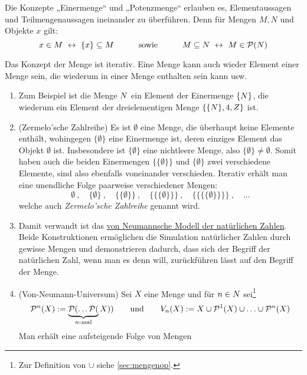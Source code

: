 \begin{bem}
    Die Konzepte „Einermenge“ und „Potenzmenge“ erlauben es, Elementaussagen und Teilmengenaussagen ineinander zu überführen. Denn für Mengen $M,N$ und Objekte $x$ gilt:
        \[ x\in M\ \leftrightarrow\ \{x\}\subseteq M \quad\qquad\text{sowie}\quad\qquad M\subseteq N\  \leftrightarrow\ M\in \calP(N) \]
\end{bem}


\begin{vorschau} \label{mengeniterativ}
    Das Konzept der Menge ist iterativ. Eine Menge kann auch wieder Element einer Menge sein, die wiederum in einer Menge enthalten sein kann usw.
    \begin{enumerate}[(1)]
        \item Zum Beispiel ist die Menge $\relax N$ ein Element der Einermenge $\{\relax N\}$, die wiederum ein Element der dreielementigen Menge $\{ \{\relax N \}, 4, \relax Z\}$ ist.
        \item(Zermelo'sche Zahlreihe) Es ist $\emptyset$ eine Menge, die überhaupt keine Elemente enthält, wohingegen $\{\emptyset\}$ eine Einermenge ist, deren einziges Element das Objekt $\emptyset$ ist. Insbesondere ist $\{\emptyset\}$ eine nichtleere Menge, also $\{\emptyset\}\neq \emptyset$. Somit haben auch die beiden Einermengen $\{\{\emptyset\}\}$ und $\{\emptyset\}$ zwei verschiedene Elemente, sind also ebenfalls voneinander verschieden. Iterativ erhält man eine unendliche Folge paarweise verschiedener Mengen:
        \[ \emptyset \ ,\quad \{\emptyset\} \ ,\quad \{\{\emptyset\}\} \ ,\quad \{\{\{\emptyset\}\}\} \ , \quad \{\{\{\{\emptyset\}\}\}\} \ ,\quad \dots \]
        welche auch \emph{Zermelo'sche Zahlreihe} genannt wird.
        \item Damit verwandt ist das \href{https://de.wikipedia.org/wiki/Nat\%C3\%BCrliche_Zahl#Von_Neumanns_Modell_der_nat\%C3\%BCrlichen_Zahlen}{von Neumannsche Modell der natürlichen Zahlen}. Beide Konstruktionen ermöglichen die Simulation natürlicher Zahlen durch gewisse Mengen und demonstrieren dadurch, dass sich der Begriff der natürlichen Zahl, wenn man es denn will, zurückführen lässt auf den Begriff der Menge.
        \item(Von-Neumann-Universum) Sei $X$ eine Menge und für $n \in \relax N$ sei\footnote{Zur Definition von $\cup$ siehe \cref{sec:mengenop}.}
        \[ \mathcal P^n(X):=\underbrace{\mathcal P(\dots\mathcal P(}_{n\text{-mal}}X)) \qquad\text{und}\qquad V_n(X):=X\cup\mathcal P^1(X)\cup\ldots\cup \mathcal P^n(X) \]
        Man erhält eine aufsteigende Folge von Mengen

\end{enumerate}
\end{vorschau}
